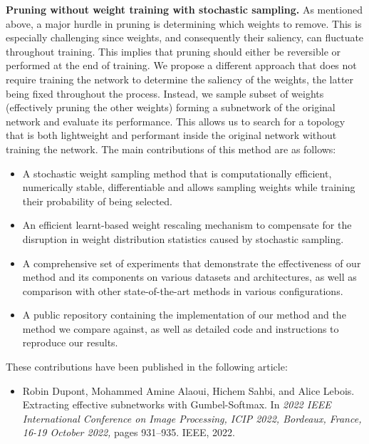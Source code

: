 \noindent \textbf{Pruning without weight training with stochastic sampling.} As
mentioned above, a major hurdle in pruning is determining which weights to
remove. This is especially challenging since weights, and consequently their
saliency, can fluctuate throughout training. This implies that pruning should
either be reversible or performed at the end of training. We propose a different
approach that does not require training the network to determine the saliency of
the weights, the latter being fixed throughout the process. Instead, we sample
subset of weights (effectively pruning the other weights) forming a subnetwork
of the original network and evaluate its performance. This allows us to search
for a topology that is both lightweight and performant inside the original
network without training the network. The main contributions of this method are
as follows: \\

\begin{itemize}
    \item A stochastic weight sampling method that is computationally efficient,
          numerically stable, differentiable and allows sampling weights while
          training their probability of being selected.
    \item An efficient learnt-based weight rescaling mechanism to compensate for
          the disruption in weight distribution statistics caused by stochastic
          sampling.
    \item A comprehensive set of experiments that demonstrate the effectiveness
          of our method and its components on various datasets and architectures, as
          well as comparison with other state-of-the-art methods in various
          configurations.
    \item A public repository containing the implementation of our method and
          the method we compare against, as well as detailed code and instructions to
          reproduce our results.\\
\end{itemize}

\noindent These contributions have been published in the following article:
\begin{itemize}
    \item Robin Dupont, Mohammed Amine Alaoui, Hichem Sahbi, and Alice
          Lebois. Extracting effective subnetworks with Gumbel-Softmax. In \textit{2022
              IEEE International Conference on Image Processing, ICIP 2022, Bordeaux,
              France, 16-19 October 2022,} pages 931–935. IEEE, 2022.\\
\end{itemize}


